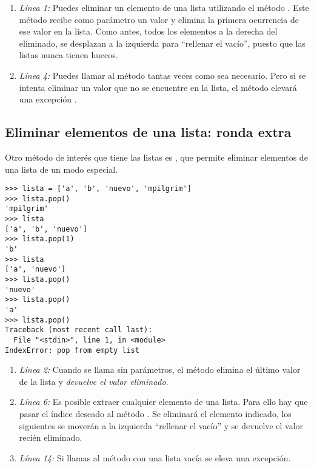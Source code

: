 \begin{enumerate}

\item \emph{Línea 1:} Puedes eliminar un elemento de una lista utilizando el método . Este método recibe como parámetro un valor y elimina la primera ocurrencia de ese valor en la lista. Como antes, todos los elementos a la derecha del eliminado, se desplazan a la izquierda para ``rellenar el vacío'', puesto que las listas nunca tienen huecos.

\item \emph{Línea 4:} Puedes llamar al método  tantas veces como sea necesario. Pero si se intenta eliminar un valor que no se encuentre en la lista, el método elevará una excepción .

\end{enumerate}

\subsection{Eliminar elementos de una lista: ronda extra}

Otro método de interés que tiene las listas es , que permite eliminar elementos de una lista de un modo especial.

\noindent\begin{minipage}{\textwidth}
\begin{lstlisting}[mathescape=True]
>>> lista = ['a', 'b', 'nuevo', 'mpilgrim']
>>> lista.pop()
'mpilgrim'
>>> lista
['a', 'b', 'nuevo']
>>> lista.pop(1)
'b'
>>> lista
['a', 'nuevo']
>>> lista.pop()
'nuevo'
>>> lista.pop()
'a'
>>> lista.pop()
Traceback (most recent call last):
  File "<stdin>", line 1, in <module>
IndexError: pop from empty list
\end{lstlisting}
\end{minipage}

\begin{enumerate}

\item \emph{Línea 2:} Cuando se llama sin parámetros, el método  elimina el último valor de la lista y \emph{devuelve el valor eliminado}.

\item \emph{Línea 6:} Es posible extraer cualquier elemento de una lista. Para ello hay que pasar el índice deseado al método . Se eliminará el elemento indicado, los siguientes se moverán a la izquierda ``rellenar el vacío'' y se devuelve el valor recién eliminado.

\item \emph{Línea 14:} Si llamas al método  con una lista vacía se eleva una excepción.

\end{enumerate}

